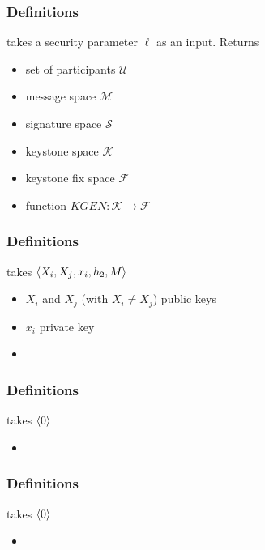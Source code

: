 \begin{frame}
	\frametitle{Definitions}

	\begin{definition}[SETUP]
		takes a security parameter $\ell$ as an input. Returns
		\begin{itemize}
			\item set of participants $\mathcal{U}$
			\item message space $\mathcal{M}$
			\item signature space $\mathcal{S}$
			\item keystone space $\mathcal{K}$
			\item keystone fix space $\mathcal{F}$
			\item function $KGEN: \mathcal{K} \to \mathcal{F}$
		\end{itemize}
	\end{definition}
\end{frame}

\begin{frame}
	\frametitle{Definitions}
	\begin{definition}[ASIGN]
	takes $\langle X_i, X_j, x_i, h_2,M \rangle$
		\begin{itemize}
			\item $X_i$ and $X_j$ (with $X_i \neq X_j$) public keys
			\item $x_i$ private key
			\item 
		\end{itemize}
	\end{definition}
\end{frame}

\begin{frame}
	\frametitle{Definitions}
	\begin{definition}[AVERIFY]
	takes $\langle 0 \rangle$
		\begin{itemize}
			\item 
		\end{itemize}
	\end{definition}
\end{frame}

\begin{frame}
	\frametitle{Definitions}
	\begin{definition}[VERIFY]
	takes $\langle 0 \rangle$
		\begin{itemize}
			\item 
		\end{itemize}
	\end{definition}
\end{frame}